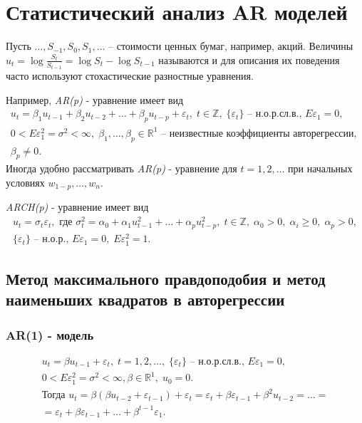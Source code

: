 \chapter{Статистический анализ AR моделей}

Пусть $ \ldots, S_{-1}, S_0, S_1, \ldots $ -- стоимости ценных бумаг, например, акций. Величины $ u_t = \log\frac{S_t}{S_{t-1}} = \log S_t - \log S_{t - 1} $ называются  и для описания их поведения часто используют стохастические разностные уравнения. 

Например, \textit{AR(p)} - уравнение имеет вид
$$\begin{gathered}
    u_t = \beta_1 u_{t - 1}  + \beta_2 u_{t - 2} + \ldots + \beta_p u_{t - p} + \varepsilon_t, \; t \in \mathbb{Z}, \; \lbrace \varepsilon_t \rbrace \text{ -- н.о.р.сл.в., } E\varepsilon_1 = 0, \\
    0 < E\varepsilon^2_1 = \sigma^2 < \infty, \; \beta_1, \ldots, \beta_p \in \mathbb{R}^1 \text{ -- неизвестные коэффициенты авторегрессии, } \\
    \beta_p \neq 0.
\end{gathered}$$
Иногда удобно рассматривать  \textit{AR(p)} - уравнение для $ t = 1, 2, \ldots $ при начальных условиях $ w_{1 - p}, \ldots, w_n. $

\textit{ARCH(p)} - уравнение имеет вид
$$\begin{gathered}
    u_t = \sigma_t\varepsilon_t, \text{ где } \sigma_t^2 = \alpha_0 + \alpha_1u_{t - 1}^2 + \ldots + \alpha_p u_{t - p}^2, \; t \in \mathbb{Z}, \; \alpha_0 > 0, \; \alpha_i \geq 0, \; \alpha_p > 0, \\
    \lbrace \varepsilon_t \rbrace \text{ -- н.о.р., } E\varepsilon_1 = 0, \; E\varepsilon_1^2 = 1.
\end{gathered}$$\newpage

\section{Метод максимального правдоподобия и метод наименьших квадратов в авторегрессии}\label{lec:10/sec:3}

\subsection*{AR(1) - модель}
$$\begin{gathered}
    u_t = \beta u_{t - 1} + \varepsilon_t, \; t = 1, 2, \ldots, \; \lbrace \varepsilon_t \rbrace \text{ -- н.о.р.сл.в., } E\varepsilon_1 = 0, \\
    0 < E\varepsilon^2_1 = \sigma^2 < \infty, \beta \in \mathbb{R}^1, \; u_0 = 0. \\ \text{Тогда } u_t = \beta ( \beta u_{t - 2} + \varepsilon_{t - 1} ) + \varepsilon_t = \varepsilon_t + \beta \varepsilon_{t - 1} + \beta^2 u_{t - 2} = \ldots = \\
    = \varepsilon_t + \beta\varepsilon_{t - 1} + \ldots + \beta^{t - 1}\varepsilon_1.
\end{gathered}$$

